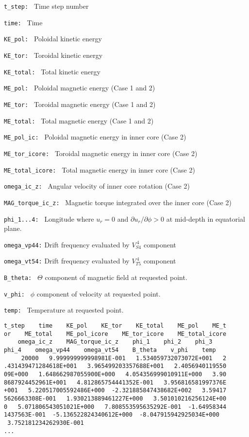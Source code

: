 \begin{description}
\item{\tt t\_step:  }  Time step number
\item{\tt time:     }  Time
\item{\tt KE\_pol:   }  Poloidal kinetic energy
\item{\tt KE\_tor:   }  Toroidal kinetic energy
\item{\tt KE\_total: }  Total kinetic energy
\item{\tt ME\_pol:   }  Poloidal magnetic energy  (Case 1 and 2)
\item{\tt ME\_tor:   }  Toroidal magnetic energy  (Case 1 and 2)
\item{\tt ME\_total: }  Total magnetic energy  (Case 1 and 2)
\item{\tt ME\_pol\_ic:      }  Poloidal magnetic energy in inner core  (Case 2)
\item{\tt ME\_tor\_icore:   }  Toroidal magnetic energy in inner core (Case 2)
\item{\tt ME\_total\_icore: }  Total magnetic energy in inner core (Case 2)
\item{\tt omega\_ic\_z: } Angular velocity of inner core rotation (Case 2)
\item{\tt MAG\_torque\_ic\_z: }  Magnetic torque integrated over the inner core (Case 2)
\item{\tt phi\_1...4: } Longitude where $u_{r} = 0$ and $\partial u_{r} / \partial \phi > 0$ at mid-depth in equatorial plane.
\item{\tt omega\_vp44:} Drift frequency evaluated by $V_{S4}^{\ 4}$ component
\item{\tt omega\_vt54:} Drift frequency evaluated by $V_{T5}^{\ 4}$ component
\item{\tt B\_theta: } $\Theta$ component of magnetic field at requested point.
\item{\tt v\_phi: } $\phi$ component of velocity at requested point.
\item{\tt temp: } Temperature at requested point.


\end{description}

{\small 
\begin{verbatim}
t_step    time    KE_pol    KE_tor    KE_total    ME_pol    ME_t
or    ME_total    ME_pol_icore    ME_tor_icore    ME_total_icore
    omega_ic_z    MAG_torque_ic_z    phi_1    phi_2    phi_3    
phi_4    omega_vp44    omega_vt54    B_theta    v_phi    temp
     20000   9.999999999998981E-001   1.534059732073072E+001   2
.431439471284618E+001   3.965499203357688E+001   2.4056940119550
09E+000   1.648662987055900E+000   4.054356999010911E+000   3.90
8687924452961E+001   4.812865754441352E-001   3.956816581997376E
+001   5.220517005592486E+000  -2.321885847438682E+002   3.59417
5626663308E-001   1.930213889461227E+000   3.501010216256124E+00
0   5.071806543051021E+000   7.808553595635292E-001  -1.64958344
1437563E-001  -5.136522824340612E+000  -8.047915942925034E+000  
 3.752181234262930E-001
...
\end{verbatim}
}
%

